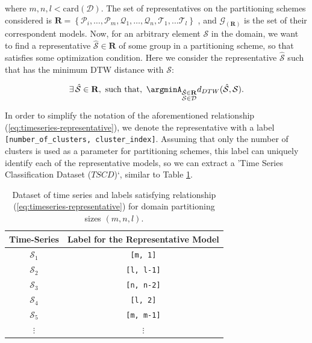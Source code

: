 where $m, n, l < \textrm{card}(\mathcal{D})$. The set of representatives on the partitioning schemes considered is $\mathbf{R} = \left\{\mathcal{P}_{i}, \ldots, \mathcal{P}_{m}, \mathcal{Q}_{1}, \ldots, \mathcal{Q}_{n}, \mathcal{T}_{1}, \ldots \mathcal{T}_{l} \right\}$ , and $\mathcal{G}_{(\mathbf{R})}$ is the set of their correspondent models. Now, for an arbitrary element $\mathcal{S}$ in the domain, we want to find a representative $\mathcal{\hat{S}} \in \mathbf{R}$ of some group in a partitioning scheme, so that satisfies some optimization condition. Here we consider the representative $\mathcal{\hat{S}}$ such that has the minimum DTW distance with $\mathcal{S}$:

\begin{equation}\label{eq:timeseries-representative}
 \exists\, \mathcal{\hat{S}} \in \mathbf{R}, \,\, \textrm{such that}, \,\, \argminA_{\substack{\mathcal{\hat{S}} \in \mathbf{R}\\\mathcal{S} \in \mathcal{D}}} d_{DTW}(\mathcal{\hat{S}}, \mathcal{S}).
\end{equation}

In order to simplify the notation of the aforementioned relationship (\ref{eq:timeseries-representative}), we denote the representative with a label \texttt{[number\_of\_clusters, cluster\_index]}. Assuming that only the number of clusters is used as a parameter for partitioning schemes, this label can uniquely identify each of the representative models, so we can extract a 'Time Series Classification Dataset ($TSCD$)`, similar to Table \ref{Tab:TSClassificationDataset}.

\begin{table}[h]
	\centering
	\begin{tabular}{|c|c|}
		\hline
		Time-Series & Label for the Representative Model\\ \hline
		$\mathcal{S}_{1}$ & \texttt{[m, 1]} \\ \hline
		$\mathcal{S}_{2}$ & \texttt{[l, l-1]} \\ \hline
		$\mathcal{S}_{3}$ & \texttt{[n, n-2]} \\ \hline
		$\mathcal{S}_{4}$ & \texttt{[l, 2]} \\ \hline
		$\mathcal{S}_{5}$ & \texttt{[m, m-1]} \\ \hline
		$\vdots$ & $\vdots$ \\ \hline
	\end{tabular}
	\caption{Dataset of time series and labels satisfying relationship (\ref{eq:timeseries-representative}) for domain partitioning sizes $(m,n,l)$.}
	\label{Tab:TSClassificationDataset}
\end{table}


